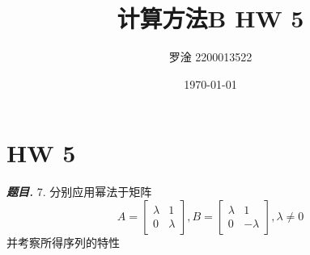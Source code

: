 \documentclass[10pt, a4paper, oneside]{ctexart}
\title{\textbf{计算方法B  HW 5}}
\author{罗淦  2200013522}
\date{\today}
\newenvironment{problem}{\begin{framed}\par\noindent\textbf{\textit{题目. }}}{\end{framed}\par}
\begin{document}
\maketitle


\section{HW 5}

\begin{problem}
    7. 分别应用幂法于矩阵
    $$A=\begin{bmatrix}
        \lambda&1\\
        0&\lambda
    \end{bmatrix}, B=\begin{bmatrix}
        \lambda&1\\
        0&-\lambda
    \end{bmatrix} ,\lambda \neq 0$$
    并考察所得序列的特性
    \end{problem}
\end{document}
